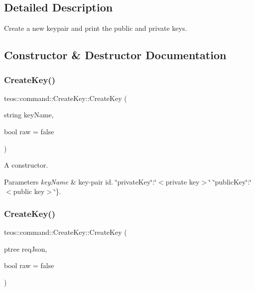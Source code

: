 \subsection{Detailed Description}
Create a new keypair and print the public and private keys. 

\subsection{Constructor \& Destructor Documentation}
\mbox{\label{classteos_1_1command_1_1_create_key_ae9e618a4fb36a19c804ad6f4625edd6b}} 
\subsubsection{\texorpdfstring{Create\+Key()}{CreateKey()}\hspace{0.1cm}{\footnotesize\ttfamily [1/2]}}
{\footnotesize\ttfamily teos\+::command\+::\+Create\+Key\+::\+Create\+Key (\begin{DoxyParamCaption}\item[{string}]{key\+Name,  }\item[{bool}]{raw = {\ttfamily false} }\end{DoxyParamCaption})\hspace{0.3cm}{\ttfamily [inline]}}



A constructor. 


\begin{DoxyParams}{Parameters}
{\em key\+Name} & key-\/pair id. \char`\"{}private\+Key\char`\"{}\+:\char`\"{}$<$private key$>$\char`\"{} \char`\"{}public\+Key\char`\"{}\+:\char`\"{}$<$public key$>$\char`\"{}\}. \\
\hline
\end{DoxyParams}
\mbox{\label{classteos_1_1command_1_1_create_key_a8d4fc54928a448593975d013db30d9e6}} 
\subsubsection{\texorpdfstring{Create\+Key()}{CreateKey()}\hspace{0.1cm}{\footnotesize\ttfamily [2/2]}}
{\footnotesize\ttfamily teos\+::command\+::\+Create\+Key\+::\+Create\+Key (\begin{DoxyParamCaption}\item[{ptree}]{req\+Json,  }\item[{bool}]{raw = {\ttfamily false} }\end{DoxyParamCaption})\hspace{0.3cm}{\ttfamily [inline]}}



